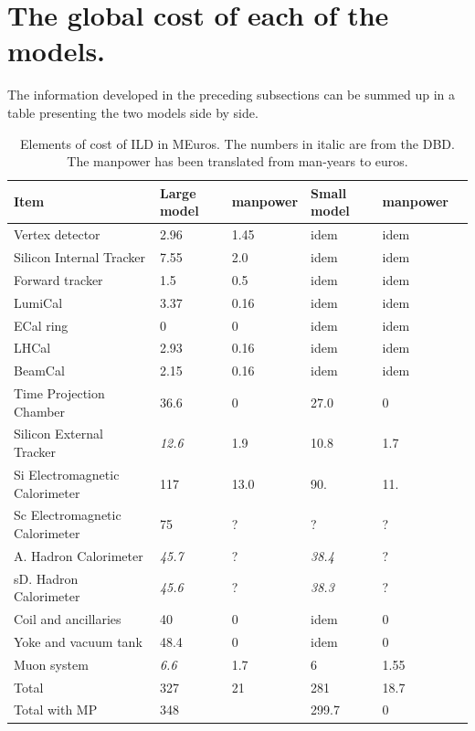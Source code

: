 \section{The global cost of each of the models.}
The information developed in the preceding subsections can be summed up in a table presenting the two models side by side.
\begin{table}[h!]\hspace*{-0cm}\small
\begin{tabular}{ l p{0.2\hsize}p{0.1\hsize}p{0.2\hsize} p{0.2\hsize}p{0.1\hsize}}
\toprule
\bf {Item}& \bf {Large model} & \bf manpower&  \bf {Small model}&\bf manpower \\
\midrule
Vertex detector    & 2.96 &1.45  &  idem &idem \\
Silicon Internal Tracker & 7.55&2.0 & idem&idem\\
Forward tracker    & 1.5  &0.5  & idem &idem  \\
LumiCal & 3.37 & 0.16& idem&idem\\
ECal ring & 0&0 & idem&idem\\
LHCal & 2.93 &0.16&idem& idem\\
BeamCal & 2.15 &0.16& idem&idem\\
\midrule
Time Projection Chamber & 36.6 & 0&27.0&0\\
Silicon External Tracker & \it12.6& 1.9&10.8&1.7\\
Si Electromagnetic Calorimeter & 117 & 13.0 & 90. & 11.\\
Sc Electromagnetic Calorimeter & 75 & ? & ? & ?\\
A. Hadron Calorimeter & \it45.7 & ? & \it38.4 & ?\\
sD. Hadron Calorimeter & \it45.6 & ? & \it38.3 & ?\\
Coil and ancillaries &  40 & 0& idem & 0\\
Yoke and vacuum tank &  48.4 & 0& idem & 0 \\
Muon system  &  \it6.6 & 1.7 & 6 & 1.55\\
\midrule
Total      & 327   &  21  & 281 & 18.7  \\
\midrule
Total with MP     & 348   &    & 299.7 & 0  \\
 \bottomrule
\end{tabular}
\caption{\label{cost_summary}Elements of cost of ILD in MEuros. The numbers in italic are from the DBD. The manpower has been translated from man-years to euros.}
\end{table}

